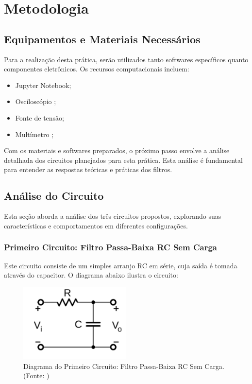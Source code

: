 \documentclass[
	12pt,				%
	openright,			%
	twoside,			%
	a4paper,			%
	english,			%
	french,				%
	spanish,			%
	brazil,				%
	]{abntex2}
\begin{document}
\clearpage
\chapter{Metodologia}

\section{Equipamentos e Materiais Necessários}
Para a realização desta prática, serão utilizados tanto softwares específicos quanto componentes eletrônicos. Os recursos computacionais incluem:
\begin{itemize}
    \item Jupyter Notebook;
    \item Osciloscópio \cite{keysight_manual};
    \item Fonte de tensão;
    \item Multímetro \cite{keysight-u1250};
\end{itemize}

Com os materiais e softwares preparados, o próximo passo envolve a análise detalhada dos circuitos planejados para esta prática. Esta análise é fundamental para entender as respostas teóricas e práticas dos filtros.

\section{Análise do Circuito}
Esta seção aborda a análise dos três circuitos propostos, explorando suas características e comportamentos em diferentes configurações.

\subsection{Primeiro Circuito: Filtro Passa-Baixa RC Sem Carga}
Este circuito consiste de um simples arranjo RC em série, cuja saída é tomada através do capacitor. O diagrama abaixo ilustra o circuito:

\begin{figure}[H]
\centering
\includegraphics[width=0.5\textwidth]{imgs/first_circuit_diagram.png}
\caption{Diagrama do Primeiro Circuito: Filtro Passa-Baixa RC Sem Carga. (Fonte: \cite{ufpe2023pratica})}
\label{fig:first_circuit_analysis}
\end{figure}
\end{document}
